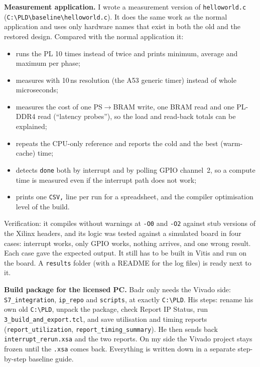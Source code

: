 \documentclass[11pt,a4paper]{article}
\newcommand{\code}[1]{\texttt{#1}}
\begin{document}
{\sloppy \textbf{Measurement application.} I wrote a measurement version of \code{helloworld.c} (\code{C:\textbackslash PLD\textbackslash baseline\textbackslash}\allowbreak\code{helloworld.c}). It does the same work as the normal application and uses only hardware names that exist in both the old and the restored design. Compared with the normal application it:\par}
\begin{itemize}[noitemsep]
  \item runs the PL 10 times instead of twice and prints minimum, average and maximum per phase;
  \item measures with 10\,ns resolution (the A53 generic timer) instead of whole microseconds;
  \item measures the cost of one PS$\rightarrow$BRAM write, one BRAM read and one PL-DDR4 read (``latency probes''), so the load and read-back totals can be explained;
  \item repeats the CPU-only reference and reports the cold and the best (warm-cache) time;
  \item detects \code{done} both by interrupt and by polling GPIO channel~2, so a compute time is measured even if the interrupt path does not work;
  \item prints one \code{CSV,} line per run for a spreadsheet, and the compiler optimisation level of the build.
\end{itemize}
Verification: it compiles without warnings at \code{-O0} and \code{-O2} against stub versions of the Xilinx headers, and its logic was tested against a simulated board in four cases: interrupt works, only GPIO works, nothing arrives, and one wrong result. Each case gave the expected output. It still has to be built in Vitis and run on the board. A \code{results} folder (with a README for the log files) is ready next to it.

\textbf{Build package for the licensed PC.} Badr only needs the Vivado side: \code{S7\_integration}, \code{ip\_repo} and \code{scripts}, at exactly \code{C:\textbackslash PLD}. His steps: rename his own old \code{C:\textbackslash PLD}, unpack the package, check Report IP Status, run \code{3\_build\_and\_export.tcl}, and save utilisation and timing reports (\code{report\_utilization}, \code{report\_timing\_summary}). He then sends back \code{interrupt\_rerun.xsa} and the two reports. On my side the Vivado project stays frozen until the \code{.xsa} comes back. Everything is written down in a separate step-by-step baseline guide.
\end{document}
